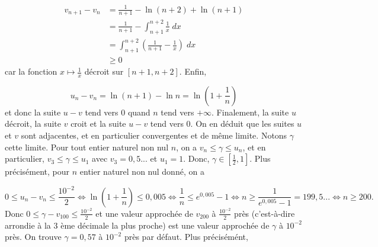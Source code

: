 {\begin{enumerate}
{\begin{align*}
v_{n+1}-v_n &= \frac{1}{n+1}-\ln(n+2)+\ln(n+1) \\
&= \frac{1}{n+1}-\int_{n+1}^{n+2}\frac{1}{x}\;dx \\
&= \int_{n+1}^{n+2}\left(\frac{1}{n+1}-\frac{1}{x}\right)\;dx \\
&\geq 0
\end{align*}
car la fonction $x\mapsto\frac{1}{x}$ décroit sur $[n+1,n+2]$. Enfin,

$$u_n-v_n=\ln(n+1)-\ln n=\ln\left(1+\frac{1}{n}\right)$$ 
et donc la suite $u-v$ tend vers 0 quand $n$ tend vers $+\infty$.
Finalement, la suite $u$ décroit, la suite $v$ croit et la suite $u-v$ tend vers $0$. On en déduit que les suites $u$ et $v$ sont adjacentes, et en particulier convergentes et de même limite. Notons $\gamma$ cette limite.
Pour tout entier naturel non nul $n$, on a $v_n\leq\gamma\leq u_n$, et en particulier, $v_3\leq\gamma\leq u_1$ avec $v_3=0,5...$ et $u_1=1$. Donc, $\gamma\in\left[\frac{1}{2},1\right]$.
Plus précisément, pour $n$ entier naturel non nul donné, on a

$$0\leq u_n-v_n\leq\frac{10^{-2}}{2}\Leftrightarrow\ln\left(1+\frac{1}{n}\right)\leq0,005\Leftrightarrow\frac{1}{n}\leq e^{0,005}-1\Leftrightarrow n\geq\frac{1}{e^{0,005}-1}=199,5...\Leftrightarrow n\geq200.$$
Donc $0\leq\gamma-v_{100}\leq\frac{10^{-2}}{2}$ et une valeur approchée de $v_{200}$ à $\frac{10^{-2}}{2}$ près (c'est-à-dire arrondie à la 3 ème décimale la plus proche) est une valeur approchée de $\gamma$ à $10^{-2}$ près. On trouve $\gamma=0,57$ à $10^{-2}$ près par défaut. Plus précisémént,

\begin{center}
\end{center}}
\end{enumerate}
}
